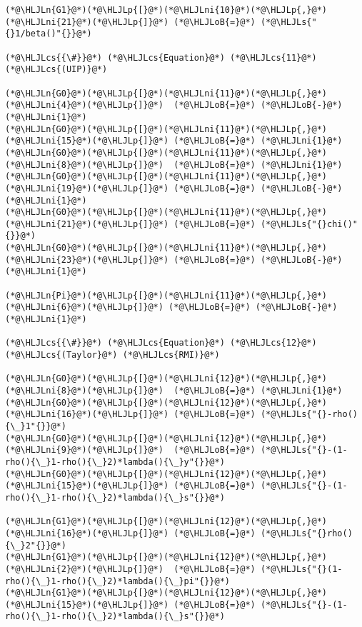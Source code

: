\documentclass[12pt,a4paper]{article}
\newcommand{\HLJLn}[1]{#1}
\newcommand{\HLJLs}[1]{\textcolor[RGB]{201,61,57}{#1}}
\newcommand{\HLJLni}[1]{\textcolor[RGB]{59,151,46}{#1}}
\newcommand{\HLJLoB}[1]{\textcolor[RGB]{102,102,102}{\textbf{#1}}}
\newcommand{\HLJLp}[1]{#1}
\newcommand{\HLJLcs}[1]{\textcolor[RGB]{153,153,119}{\textit{#1}}}
\begin{document}
\begin{lstlisting}
(*@\HLJLn{G1}@*)(*@\HLJLp{[}@*)(*@\HLJLni{10}@*)(*@\HLJLp{,}@*)(*@\HLJLni{21}@*)(*@\HLJLp{]}@*) (*@\HLJLoB{=}@*) (*@\HLJLs{"{}1/beta()"{}}@*)

(*@\HLJLcs{{\#}}@*) (*@\HLJLcs{Equation}@*) (*@\HLJLcs{11}@*) (*@\HLJLcs{(UIP)}@*)

(*@\HLJLn{G0}@*)(*@\HLJLp{[}@*)(*@\HLJLni{11}@*)(*@\HLJLp{,}@*)(*@\HLJLni{4}@*)(*@\HLJLp{]}@*)  (*@\HLJLoB{=}@*) (*@\HLJLoB{-}@*)(*@\HLJLni{1}@*)
(*@\HLJLn{G0}@*)(*@\HLJLp{[}@*)(*@\HLJLni{11}@*)(*@\HLJLp{,}@*)(*@\HLJLni{15}@*)(*@\HLJLp{]}@*) (*@\HLJLoB{=}@*) (*@\HLJLni{1}@*)
(*@\HLJLn{G0}@*)(*@\HLJLp{[}@*)(*@\HLJLni{11}@*)(*@\HLJLp{,}@*)(*@\HLJLni{8}@*)(*@\HLJLp{]}@*)  (*@\HLJLoB{=}@*) (*@\HLJLni{1}@*)
(*@\HLJLn{G0}@*)(*@\HLJLp{[}@*)(*@\HLJLni{11}@*)(*@\HLJLp{,}@*)(*@\HLJLni{19}@*)(*@\HLJLp{]}@*) (*@\HLJLoB{=}@*) (*@\HLJLoB{-}@*)(*@\HLJLni{1}@*)
(*@\HLJLn{G0}@*)(*@\HLJLp{[}@*)(*@\HLJLni{11}@*)(*@\HLJLp{,}@*)(*@\HLJLni{21}@*)(*@\HLJLp{]}@*) (*@\HLJLoB{=}@*) (*@\HLJLs{"{}chi()"{}}@*)
(*@\HLJLn{G0}@*)(*@\HLJLp{[}@*)(*@\HLJLni{11}@*)(*@\HLJLp{,}@*)(*@\HLJLni{23}@*)(*@\HLJLp{]}@*) (*@\HLJLoB{=}@*) (*@\HLJLoB{-}@*)(*@\HLJLni{1}@*)

(*@\HLJLn{Pi}@*)(*@\HLJLp{[}@*)(*@\HLJLni{11}@*)(*@\HLJLp{,}@*)(*@\HLJLni{6}@*)(*@\HLJLp{]}@*) (*@\HLJLoB{=}@*) (*@\HLJLoB{-}@*)(*@\HLJLni{1}@*)

(*@\HLJLcs{{\#}}@*) (*@\HLJLcs{Equation}@*) (*@\HLJLcs{12}@*) (*@\HLJLcs{(Taylor}@*) (*@\HLJLcs{RMI)}@*)

(*@\HLJLn{G0}@*)(*@\HLJLp{[}@*)(*@\HLJLni{12}@*)(*@\HLJLp{,}@*)(*@\HLJLni{8}@*)(*@\HLJLp{]}@*)  (*@\HLJLoB{=}@*) (*@\HLJLni{1}@*)
(*@\HLJLn{G0}@*)(*@\HLJLp{[}@*)(*@\HLJLni{12}@*)(*@\HLJLp{,}@*)(*@\HLJLni{16}@*)(*@\HLJLp{]}@*) (*@\HLJLoB{=}@*) (*@\HLJLs{"{}-rho(){\_}1"{}}@*)
(*@\HLJLn{G0}@*)(*@\HLJLp{[}@*)(*@\HLJLni{12}@*)(*@\HLJLp{,}@*)(*@\HLJLni{9}@*)(*@\HLJLp{]}@*)  (*@\HLJLoB{=}@*) (*@\HLJLs{"{}-(1-rho(){\_}1-rho(){\_}2)*lambda(){\_}y"{}}@*)
(*@\HLJLn{G0}@*)(*@\HLJLp{[}@*)(*@\HLJLni{12}@*)(*@\HLJLp{,}@*)(*@\HLJLni{15}@*)(*@\HLJLp{]}@*) (*@\HLJLoB{=}@*) (*@\HLJLs{"{}-(1-rho(){\_}1-rho(){\_}2)*lambda(){\_}s"{}}@*)

(*@\HLJLn{G1}@*)(*@\HLJLp{[}@*)(*@\HLJLni{12}@*)(*@\HLJLp{,}@*)(*@\HLJLni{16}@*)(*@\HLJLp{]}@*) (*@\HLJLoB{=}@*) (*@\HLJLs{"{}rho(){\_}2"{}}@*)
(*@\HLJLn{G1}@*)(*@\HLJLp{[}@*)(*@\HLJLni{12}@*)(*@\HLJLp{,}@*)(*@\HLJLni{2}@*)(*@\HLJLp{]}@*)  (*@\HLJLoB{=}@*) (*@\HLJLs{"{}(1-rho(){\_}1-rho(){\_}2)*lambda(){\_}pi"{}}@*)
(*@\HLJLn{G1}@*)(*@\HLJLp{[}@*)(*@\HLJLni{12}@*)(*@\HLJLp{,}@*)(*@\HLJLni{15}@*)(*@\HLJLp{]}@*) (*@\HLJLoB{=}@*) (*@\HLJLs{"{}-(1-rho(){\_}1-rho(){\_}2)*lambda(){\_}s"{}}@*)


\end{lstlisting}
\end{document}
